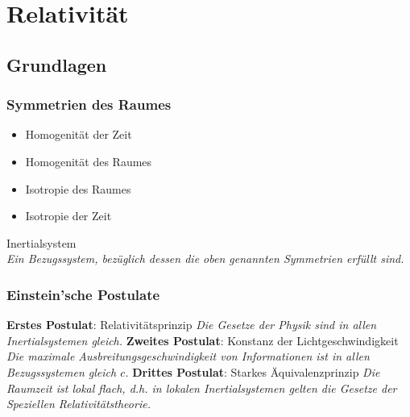 \section{Relativität}
	\subsection{Grundlagen}
		\subsubsection{Symmetrien des Raumes}
			\begin{itemize}
				\item Homogenität der Zeit
				\item Homogenität des Raumes
				\item Isotropie des Raumes
				\item Isotropie der Zeit
			\end{itemize}

			\noindent
			Inertialsystem \\
				\indent \textit{Ein Bezugssystem, bezüglich dessen die oben genannten Symmetrien erfüllt sind.}

		\subsubsection{Einstein'sche Postulate}
			\textbf{Erstes Postulat}: Relativitätsprinzip \newline
				\indent \textit{Die Gesetze der Physik sind in allen Inertialsystemen gleich.}  \nl
			\textbf{Zweites Postulat}: Konstanz der Lichtgeschwindigkeit \newline
				\indent \textit{Die maximale Ausbreitungsgeschwindigkeit von Informationen ist in allen Bezugssystemen gleich $c$.}  \nl
			\textbf{Drittes Postulat}: Starkes Äquivalenzprinzip \newline
				\indent \textit{Die Raumzeit ist lokal flach, d.h. in lokalen Inertialsystemen gelten die Gesetze der Speziellen Relativitätstheorie.}  \vsp


